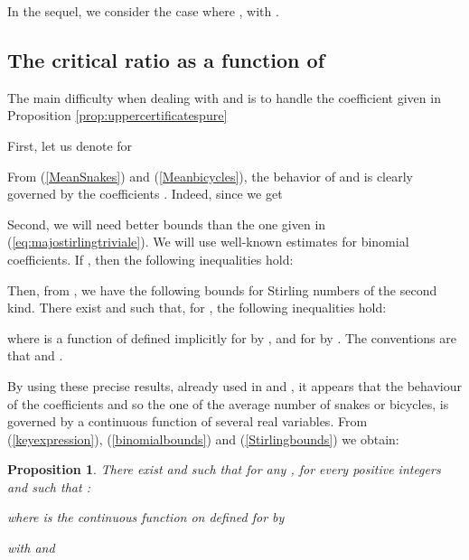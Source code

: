 \documentclass[aop,noinfoline]{imsart}
\newtheorem{proposition}[theorem]{Proposition}
\begin{document}
In the sequel, we consider the case where , with . 

\subsection{The critical ratio as a function of }


 The main  difficulty when dealing with  and  is to handle the coefficient  given in Proposition \ref{prop:uppercertificatespure} 

    
    First, let us denote for   
         
From (\ref{MeanSnakes}) and (\ref{Meanbicycles}), the behavior of  and  is clearly governed by the  coefficients . Indeed,  since  we get      
         

Second, we will need   better bounds than the one given in (\ref{eq:majostirlingtriviale}). We will use  well-known estimates for binomial coefficients.  If , then the following inequalities hold:

Then, from  \cite{Temme-93}, we have the following bounds
for Stirling numbers of the second kind. There exist  
 and  such that, for , the following inequalities hold:
 
where  is a function of  defined implicitly for  by
 , and for  by .
The conventions are that  and .

By using these precise results, already used in \cite{DuboisB-97} and \cite{CreignouDE-07},  it appears that the behaviour of the coefficients  and so the one of the average number of snakes or bicycles, is  governed by a continuous function of several real variables. From (\ref{keyexpression}), (\ref{binomialbounds}) and (\ref{Stirlingbounds})  we obtain: 
\begin{proposition}\label{thebig} There exist  and  such that   for any  , for every positive  integers  and  such that     :  
  
 where  is the continuous  function  on   defined for  by
 
 with  and  
  \end{proposition}
\end{document}
